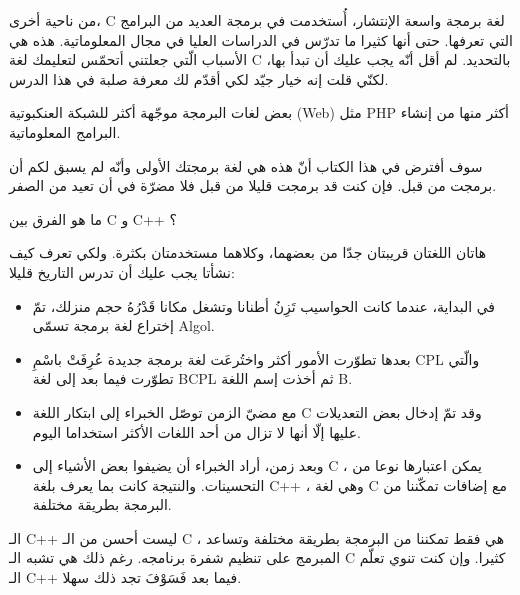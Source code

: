 من ناحية أخرى،
\textenglish{C}
لغة برمجة واسعة الإنتشار، أُستخدمت في برمجة العديد من البرامج التي تعرفها. حتى أنها كثيرا ما تدرّس في الدراسات العليا في مجال المعلوماتية.
هذه هي الأسباب الّتي جعلتني أتحمّس لتعليمك لغة
\textenglish{C}
بالتحديد. لم أقل أنّه يجب عليك أن تبدأ بها، لكنّي قلت إنه خيار جيّد لكي أقدّم لك معرفة صلبة في هذا الدرس.

\begin{information}
  بعض لغات البرمجة موجّهة أكثر للشبكة العنكبوتية
 (\textenglish{Web})
 مثل
 \textenglish{PHP}
 أكثر منها من إنشاء البرامج المعلوماتية.
\end{information}

سوف أفترض في هذا الكتاب أنّ هذه هي لغة برمجتك الأولى وأنّه لم يسبق لكم أن برمجت من قبل. فإن كنت قد برمجت قليلا من قبل فلا مضرّة في أن تعيد من الصفر.

\begin{question}
  ما هو الفرق بين
  \textenglish{C}
  و
  \textenglish{C++}
  ؟
\end{question}

هاتان اللغتان قريبتان جدّا من بعضهما، وكلاهما مستخدمتان بكثرة. ولكي تعرف كيف نشأتا يجب عليك أن تدرس التاريخ قليلا:
\begin{itemize}
  \item في البداية، عندما كانت الحواسيب تَزِنُ أطنانا وتشغل مكانا قَدْرُهُ حجم منزلك، تمّ إختراع لغة برمجة تسمّى
\textenglish{Algol}.
  \item بعدها تطوّرت الأمور أكثر واختُرعَت لغة برمجة جديدة عُرِفَتْ باسْمِ
\textenglish{CPL}
 والّتي تطوّرت فيما بعد إلى لغة
\textenglish{BCPL}
 ثم أخذت إسم اللغة
\textenglish{B}.
  \item مع مضيّ الزمن توصّل الخبراء إلى ابتكار اللغة
\textenglish{C}
 وقد تمّ إدخال بعض التعديلات عليها إلّا أنها لا تزال من أحد اللغات الأكثر استخداما اليوم.
  \item وبعد زمن، أراد الخبراء أن يضيفوا بعض الأشياء إلى
\textenglish{C}
، يمكن اعتبارها نوعا من التحسينات. والنتيجة كانت بما يعرف بلغة
\textenglish{C++}
، وهي لغة
\textenglish{C}
 مع إضافات تمكّننا من البرمجة بطريقة مختلفة.
\end{itemize}

\begin{information}
  الـ
\textenglish{C++}
ليست أحسن من الـ
\textenglish{C}
، هي فقط تمكننا من البرمجة بطريقة مختلفة وتساعد المبرمج على تنظيم شفرة برنامجه. رغم ذلك هي تشبه الـ
\textenglish{C}
كثيرا. وإن كنت تنوي تعلّم الـ
\textenglish{C++}
فيما بعد فَسَوْفَ تجد ذلك سهلا.
\end{information}

